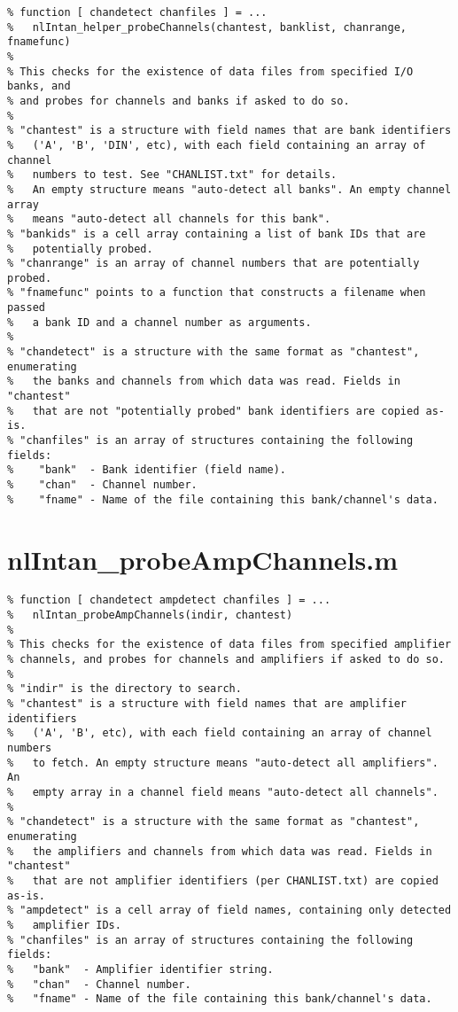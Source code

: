 \begin{verbatim}
% function [ chandetect chanfiles ] = ...
%   nlIntan_helper_probeChannels(chantest, banklist, chanrange, fnamefunc)
%
% This checks for the existence of data files from specified I/O banks, and
% and probes for channels and banks if asked to do so.
%
% "chantest" is a structure with field names that are bank identifiers
%   ('A', 'B', 'DIN', etc), with each field containing an array of channel
%   numbers to test. See "CHANLIST.txt" for details.
%   An empty structure means "auto-detect all banks". An empty channel array
%   means "auto-detect all channels for this bank".
% "bankids" is a cell array containing a list of bank IDs that are
%   potentially probed.
% "chanrange" is an array of channel numbers that are potentially probed.
% "fnamefunc" points to a function that constructs a filename when passed
%   a bank ID and a channel number as arguments.
%
% "chandetect" is a structure with the same format as "chantest", enumerating
%   the banks and channels from which data was read. Fields in "chantest"
%   that are not "potentially probed" bank identifiers are copied as-is.
% "chanfiles" is an array of structures containing the following fields:
%    "bank"  - Bank identifier (field name).
%    "chan"  - Channel number.
%    "fname" - Name of the file containing this bank/channel's data.
\end{verbatim}

\section{nlIntan\_probeAmpChannels.m}

\begin{verbatim}
% function [ chandetect ampdetect chanfiles ] = ...
%   nlIntan_probeAmpChannels(indir, chantest)
%
% This checks for the existence of data files from specified amplifier
% channels, and probes for channels and amplifiers if asked to do so.
%
% "indir" is the directory to search.
% "chantest" is a structure with field names that are amplifier identifiers
%   ('A', 'B', etc), with each field containing an array of channel numbers
%   to fetch. An empty structure means "auto-detect all amplifiers". An
%   empty array in a channel field means "auto-detect all channels".
%
% "chandetect" is a structure with the same format as "chantest", enumerating
%   the amplifiers and channels from which data was read. Fields in "chantest"
%   that are not amplifier identifiers (per CHANLIST.txt) are copied as-is.
% "ampdetect" is a cell array of field names, containing only detected
%   amplifier IDs.
% "chanfiles" is an array of structures containing the following fields:
%   "bank"  - Amplifier identifier string.
%   "chan"  - Channel number.
%   "fname" - Name of the file containing this bank/channel's data.
\end{verbatim}

